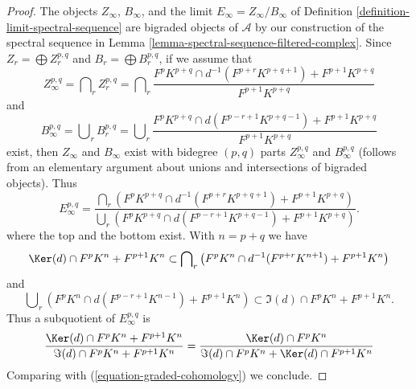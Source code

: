 \begin{proof}
The objects $Z_\infty$, $B_\infty$, and the limit
$E_\infty = Z_\infty/B_\infty$ of
Definition \ref{definition-limit-spectral-sequence}
are bigraded objects of $\mathcal{A}$ by our construction of the
spectral sequence in Lemma \ref{lemma-spectral-sequence-filtered-complex}.
Since $Z_r = \bigoplus Z_r^{p, q}$ and $B_r = \bigoplus B_r^{p, q}$,
if we assume that
$$
Z_\infty^{p, q} = \bigcap\nolimits_r Z_r^{p, q} =
\bigcap\nolimits_r
\frac{F^pK^{p + q} \cap d^{-1}(F^{p + r}K^{p + q + 1}) + F^{p + 1}K^{p + q}}
{F^{p + 1}K^{p + q}}
$$
and
$$
B_\infty^{p, q} = \bigcup\nolimits_r B_r^{p, q} =
\bigcup\nolimits_r
\frac{F^pK^{p + q} \cap d(F^{p - r + 1}K^{p + q - 1}) + F^{p + 1}K^{p + q}}
{F^{p + 1}K^{p + q}}
$$
exist, then $Z_\infty$ and $B_\infty$ exist with bidegree $(p, q)$
parts $Z_\infty^{p, q}$ and $B_\infty^{p, q}$ (follows from an elementary
argument about unions and intersections of bigraded objects). Thus
$$
E_\infty^{p, q} =
\frac{\bigcap_r (F^pK^{p + q} \cap d^{-1}(F^{p + r}K^{p + q + 1})
+ F^{p + 1}K^{p + q})}
{\bigcup_r (F^pK^{p + q} \cap d(F^{p - r + 1}K^{p + q - 1})
+ F^{p + 1}K^{p + q})}.
$$
where the top and the bottom exist. With $n = p + q$ we have
\begin{equation}
\label{equation-on-top-bigraded}
\Ker(d) \cap F^pK^{n} + F^{p + 1}K^{n}
\subset
\bigcap\nolimits_r
\left(
F^pK^{n} \cap d^{-1}(F^{p + r}K^{n + 1}) + F^{p + 1}K^{n}
\right)
\end{equation}
and
\begin{equation}
\label{equation-at-bottom-bigraded}
\bigcup\nolimits_r
\left(
F^pK^{n} \cap d(F^{p - r + 1}K^{n - 1}) + F^{p + 1}K^{n}
\right)
\subset
\Im(d) \cap F^pK^{n} + F^{p + 1}K^{n}.
\end{equation}
Thus a subquotient of $E_\infty^{p, q}$ is
$$
\frac{\Ker(d) \cap F^pK^{n} + F^{p + 1}K^n}
{\Im(d) \cap F^pK^{n} + F^{p + 1}K^{n}} =
\frac{\Ker(d) \cap F^pK^n}{\Im(d) \cap F^pK^n + \Ker(d) \cap F^{p + 1}K^n}
$$
Comparing with (\ref{equation-graded-cohomology}) we conclude.
\end{proof}

